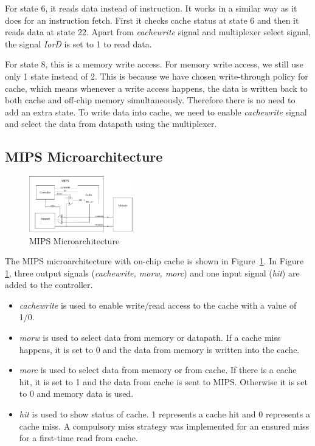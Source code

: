 \documentclass[conference]{IEEEtran}
\begin{document}
For state 6, it reads data instead of instruction. It works in a similar way as it does for an instruction fetch. First it checks cache status at state 6 and then it reads data at state 22. Apart from \textit{cachewrite} signal and multiplexer select signal, the signal \textit{IorD} is set to 1 to read data.

For state 8, this is a memory write access. For memory write access, we still use only 1 state instead of 2. This is because we have chosen write-through policy for cache, which means whenever a write access happens, the data is written back to both cache and off-chip memory simultaneously. Therefore there is no need to add an extra state. To write data into cache, we need to enable \textit{cachewrite} signal and select the data from datapath using the multiplexer. 




\subsection{MIPS Microarchitecture}
\begin{figure}[h!]
  \centering
    \includegraphics[width=0.4\textwidth]{arch.pdf}
  \caption{MIPS Microarchitecture}
  \label{fig:arch}
\end{figure}


 

The MIPS microarchitecture with on-chip cache is shown in Figure~\ref{fig:arch}. In Figure \ref{fig:arch}, three output signals (\textit{cachewrite, morw, morc}) and one input signal
(\textit{hit}) are added to the controller. 

\begin{itemize}
\item\textit{cachewrite} is used to
enable write/read access to the cache with a value of 1/0. 

\item\textit{morw} is used
to select data from memory or datapath. If a cache miss happens, it is set
to 0 and the data from memory is written into the cache. 

\item\textit{morc} is used to select data from memory or from cache. If there is a
cache hit, it is set to 1 and the data from cache is sent to MIPS. Otherwise it
is set to 0 and memory data is used.

\item\textit{hit} is used to show status of cache. 1 represents a cache hit and
0 represents a cache miss. A compulsory miss strategy was implemented for an ensured miss for a first-time read from cache.
\end{itemize}
\end{document}
